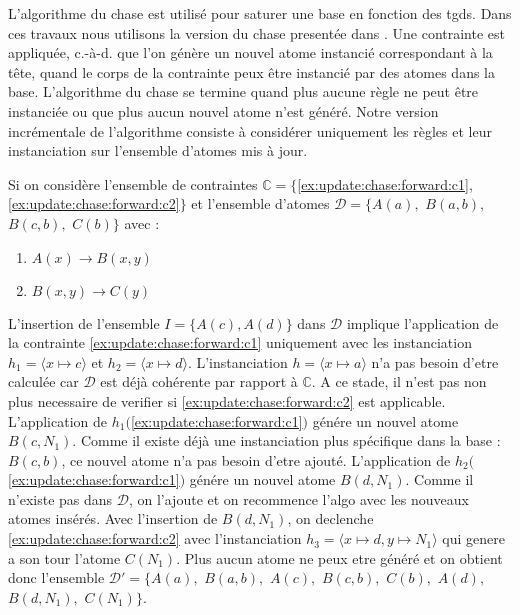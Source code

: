 L'algorithme du \gls{chase} \cite{ahoTheoryJoinsRelational1979,maierTestingImplicationsData1979} est utilisé pour saturer une base en fonction des \glspl{tgd}.
Dans ces travaux nous utilisons la version du chase presentée dans \cite{chabinConsistentUpdatingDatabases2020}.
Une contrainte est appliquée, c.-à-d. que l'on génère un nouvel atome instancié correspondant à la tête, quand le corps de la contrainte peux être instancié par des atomes dans la base.
L'algorithme du \gls{chase} se termine quand plus aucune règle ne peut être instanciée ou que plus aucun nouvel atome n'est généré.
Notre version incrémentale de l'algorithme consiste à considérer uniquement les règles et leur instanciation sur l'ensemble d'atomes mis à jour.

\begin{example}
    \label{ex:update:chase:forward}
    Si on considère l'ensemble de contraintes $\mathbb{C} = \{$\ref{ex:update:chase:forward:c1}, \ref{ex:update:chase:forward:c2}$\}$ et l'ensemble d'atomes $\mathcal{D} = \{A(a),$ $B(a, b),$ $B(c, b),$ $C(b)\}$ avec :

    \begin{multicols}{2}
        \begin{enumerate}[label=\textbf{$c_\arabic*$ :},ref=$c_\arabic*$]
            \centering
            \item $A(x) \to B(x, y)$ \label{ex:update:chase:forward:c1}
            \item $B(x, y) \to C(y)$ \label{ex:update:chase:forward:c2}
        \end{enumerate}
    \end{multicols}

    L'insertion de l'ensemble $I = \{A(c), A(d)\}$ dans $\mathcal{D}$ implique l'application de la contrainte \ref{ex:update:chase:forward:c1} uniquement avec les instanciation $h_1 = \langle x \mapsto c \rangle$ et $h_2 = \langle x \mapsto d \rangle$.
    L'instanciation $h = \langle x \mapsto a \rangle$ n'a pas besoin d'etre calculée car $\mathcal{D}$ est déjà cohérente par rapport à $\mathbb{C}$.
    A ce stade, il n'est pas non plus necessaire de verifier si \ref{ex:update:chase:forward:c2} est applicable.
    L'application de $h_1($\ref{ex:update:chase:forward:c1}$)$ génére un nouvel atome $B(c, N_1)$.
    Comme il existe déjà une instanciation plus spécifique dans la base : $B(c, b)$, ce nouvel atome n'a pas besoin d'etre ajouté.
    L'application de $h_2($\ref{ex:update:chase:forward:c1}$)$ génére un nouvel atome $B(d, N_1)$.
    Comme il n'existe pas dans $\mathcal{D}$, on l'ajoute et on recommence l'algo avec les nouveaux atomes insérés.
    Avec l'insertion de $B(d, N_1)$, on declenche \ref{ex:update:chase:forward:c2} avec l'instanciation $h_3 = \langle x \mapsto d, y \mapsto N_1 \rangle$ qui genere a son tour l'atome $C(N_1)$.
    Plus aucun atome ne peux etre généré et on obtient donc l'ensemble $\mathcal{D}' = \{A(a),$ $B(a, b),$ $A(c),$ $B(c, b),$ $C(b),$ $A(d),$ $B(d, N_1),$ $C(N_1)\}$.
\end{example}

